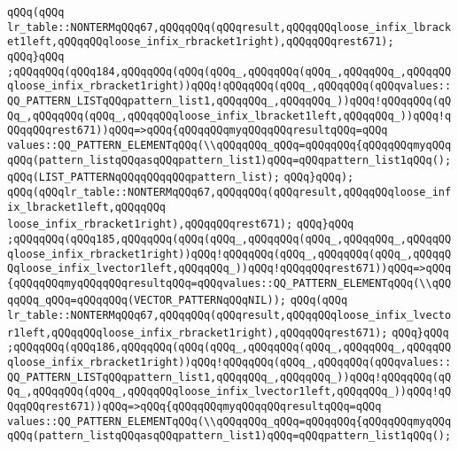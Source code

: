 \verb|qQQq(qQQq|\newline
\verb|lr_table::NONTERMqQQq67,qQQqqQQq(qQQqresult,qQQqqQQqloose_infix_lbracket1left,qQQqqQQqloose_infix_rbracket1right),qQQqqQQqrest671);|\newline
\verb|qQQq}qQQq|\newline
\verb|;qQQqqQQq(qQQq184,qQQqqQQq(qQQq(qQQq_,qQQqqQQq(qQQq_,qQQqqQQq_,qQQqqQQqloose_infix_rbracket1right))qQQq!qQQqqQQq(qQQq_,qQQqqQQq(qQQqvalues::QQ_PATTERN_LISTqQQqpattern_list1,qQQqqQQq_,qQQqqQQq_))qQQq!qQQqqQQq(qQQq_,qQQqqQQq(qQQq_,qQQqqQQqloose_infix_lbracket1left,qQQqqQQq_))qQQq!qQQqqQQqrest671))qQQq=>qQQq{qQQqqQQqmyqQQqqQQqresultqQQq=qQQq|\newline
\verb|values::QQ_PATTERN_ELEMENTqQQq(\\qQQqqQQq_qQQq=qQQqqQQq{qQQqqQQqmyqQQqqQQq(pattern_listqQQqasqQQqpattern_list1)qQQq=qQQqpattern_list1qQQq();|\newline
\verb|qQQq(LIST_PATTERNqQQqqQQqqQQqpattern_list);|\newline
\verb|qQQq}qQQq);|\newline
\verb|qQQq(qQQqlr_table::NONTERMqQQq67,qQQqqQQq(qQQqresult,qQQqqQQqloose_infix_lbracket1left,qQQqqQQq|\newline
\verb|loose_infix_rbracket1right),qQQqqQQqrest671);|\newline
\verb|qQQq}qQQq|\newline
\verb|;qQQqqQQq(qQQq185,qQQqqQQq(qQQq(qQQq_,qQQqqQQq(qQQq_,qQQqqQQq_,qQQqqQQqloose_infix_rbracket1right))qQQq!qQQqqQQq(qQQq_,qQQqqQQq(qQQq_,qQQqqQQqloose_infix_lvector1left,qQQqqQQq_))qQQq!qQQqqQQqrest671))qQQq=>qQQq{qQQqqQQqmyqQQqqQQqresultqQQq=qQQqvalues::QQ_PATTERN_ELEMENTqQQq(\\qQQqqQQq_qQQq=qQQqqQQq(VECTOR_PATTERNqQQqNIL));|\newline
\verb|qQQq(qQQq|\newline
\verb|lr_table::NONTERMqQQq67,qQQqqQQq(qQQqresult,qQQqqQQqloose_infix_lvector1left,qQQqqQQqloose_infix_rbracket1right),qQQqqQQqrest671);|\newline
\verb|qQQq}qQQq|\newline
\verb|;qQQqqQQq(qQQq186,qQQqqQQq(qQQq(qQQq_,qQQqqQQq(qQQq_,qQQqqQQq_,qQQqqQQqloose_infix_rbracket1right))qQQq!qQQqqQQq(qQQq_,qQQqqQQq(qQQqvalues::QQ_PATTERN_LISTqQQqpattern_list1,qQQqqQQq_,qQQqqQQq_))qQQq!qQQqqQQq(qQQq_,qQQqqQQq(qQQq_,qQQqqQQqloose_infix_lvector1left,qQQqqQQq_))qQQq!qQQqqQQqrest671))qQQq=>qQQq{qQQqqQQqmyqQQqqQQqresultqQQq=qQQq|\newline
\verb|values::QQ_PATTERN_ELEMENTqQQq(\\qQQqqQQq_qQQq=qQQqqQQq{qQQqqQQqmyqQQqqQQq(pattern_listqQQqasqQQqpattern_list1)qQQq=qQQqpattern_list1qQQq();|\newline
